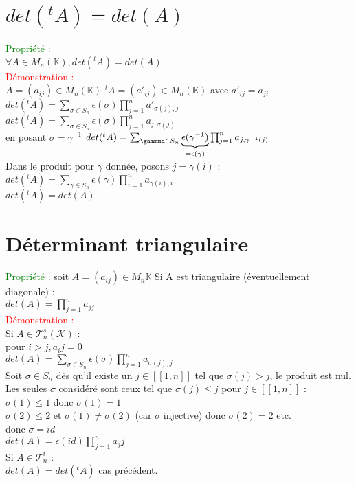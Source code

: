 \documentclass{article}
\begin{document}
	\section{$det({}^tA)=det(A)$}
	\textcolor{green}{Propriété :} \\
	$\forall A \in M_n(\mathbb K), det({}^tA)=det(A)$ \\
	\textcolor{red}{Démonstration :} \\
	$A=(a_{ij}) \in M_n(\mathbb K)$  ${}^tA=(a'_{ij}) \in M_n(\mathbb K)$ avec $a'_{ij}=a_{ji}$ \\
	$det({}^tA)= \sum_{\sigma \in S_n} \epsilon(\sigma) \prod_{j=1}^n a'_{\sigma(j),j}$ \\
	$det({}^tA)= \sum_{\sigma \in S_n} \epsilon(\sigma) \prod_{j=1}^n a_{j,\sigma(j)}$  \\
	en posant $\sigma= \gamma^{-1}$ $det({}^tA)= \sum_{\gammma \in S_n} \underbrace{\epsilon(\gamma^{-1})}_{=\epsilon(\gamma)} \prod_{j=1}^n a_{j,\gamma^{-1}(j)}$ \\
	Dans le produit pour $\gamma$ donnée, posons $j= \gamma(i)$ : \\
	$det({}^tA)= \sum_{\gamma \in S_n} \epsilon(\gamma) \prod_{i=1}^n a_{\gamma(i),i}$ \\
	$det({}^tA)=det(A)$
	\section{Déterminant triangulaire}
	\textcolor{green}{Propriété :} soit $A=(a_{ij}) \in M_n{\mathbb K}$
	Si A est triangulaire (éventuellement diagonale) : \\
	$det(A)= \prod_{j=1}^n a_{jj}$ \\
	\textcolor{red}{Démonstration :} \\
	Si $A \in \mathcal T^s_n(\mathcal K)$ : \\
	pour $i>j, a_ij=0$ \\
	$det(A)=\sum_{\sigma \in S_n} \epsilon(\sigma) \prod_{j=1}^n a_{\sigma(j),j}$ \\
	Soit $\sigma \in S_n$ dès qu'il existe un $j \in [[1,n]]$ tel que $\sigma(j)>j$, le produit est nul. Les seules $\sigma$ considéré sont ceux tel que $\sigma(j)\leq j$ pour $j \in [[1,n]]$ : \\
	$\sigma(1) \leq 1$ donc $\sigma(1)=1$ \\
	$\sigma(2) \leq 2$ et $\sigma(1)\neq \sigma(2)$ (car $\sigma$ injective) donc $\sigma(2)=2$ etc. \\
	donc $\sigma=id$ \\
	$det(A) = \epsilon(id) \prod_{j=1}^n a_jj $ \\
	Si $A \in \mathcal T^i_n$ : \\
	$det(A)=det({}^t A)$ cas précédent.
	
\end{document}
